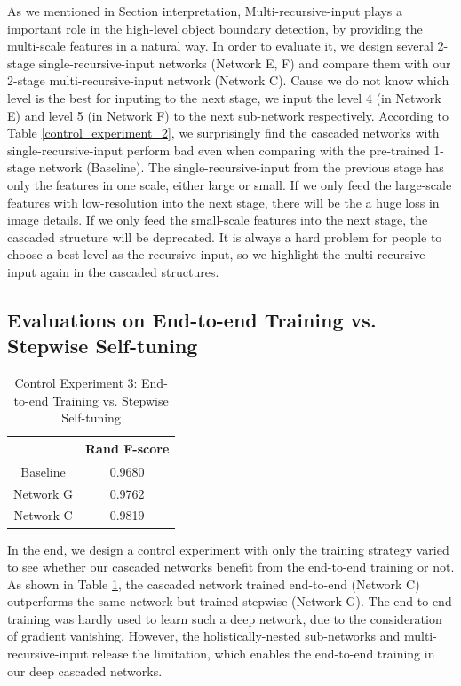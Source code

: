 \documentclass[senior]{IPSstyle}
\begin{document}
As we mentioned in Section {interpretation}, Multi-recursive-input plays a important role in the high-level object boundary detection, by providing the multi-scale features in a natural way. In order to evaluate it, we design several 2-stage single-recursive-input networks (Network E, F) and compare them with our 2-stage multi-recursive-input network (Network C). Cause we do not know which level is the best for inputing to the next stage, we input the level 4 (in Network E) and level 5 (in Network F) to the next sub-network respectively. According to Table \ref{control_experiment_2}, we surprisingly find the cascaded networks with single-recursive-input perform bad even when comparing with the pre-trained 1-stage network (Baseline). The single-recursive-input from the previous stage has only the features in one scale, either large or small. If we only feed the large-scale features with low-resolution into the next stage, there will be the a huge loss in image details. If we only feed the small-scale features into the next stage, the cascaded structure will be deprecated. It is always a hard problem for people to choose a best level as the recursive input, so we highlight the multi-recursive-input again in the cascaded structures.

\subsection{Evaluations on End-to-end Training vs. Stepwise Self-tuning}

\begin{table}[t]
\renewcommand{\arraystretch}{0.6}
\caption{Control Experiment 3: End-to-end Training vs. Stepwise Self-tuning}
\label{outcome}
\begin{center}
\begin{tabular}{|c|c|}
\hline
&\multicolumn{1}{c|}{Rand F-score}\\
\hline
Baseline	 		& 0.9680	\\	\hline
Network G 		& 0.9762	\\	\hline
Network C 		& 0.9819	\\	\hline
\end{tabular}
\end{center}
\label{control_experiment_3}
\end{table}

In the end, we design a control experiment with only the training strategy varied to see whether our cascaded networks benefit from the end-to-end training or not. As shown in Table \ref{control_experiment_3}, the cascaded network trained end-to-end (Network C) outperforms the same network but trained stepwise (Network G). The end-to-end training was hardly used to learn such a deep network, due to the consideration of gradient vanishing. However, the holistically-nested sub-networks and multi-recursive-input release the limitation, which enables the end-to-end training in our deep cascaded networks. 
\end{document}
